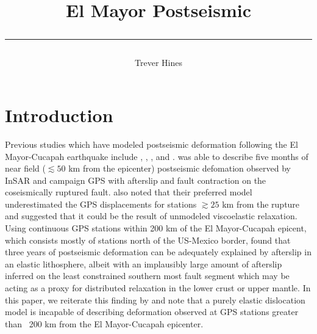 \documentclass[12pt]{article}
\title{	
El Mayor Postseismic
\author{Trever Hines}
\rule{\headwidth}{1.0pt}
}
\begin{document}
\maketitle
\section*{Introduction}

Previous studies which have modeled postseismic deformation following the El Mayor-Cucapah earthquake include \cite{Pollitz2012}, \cite{Gonzalez-ortega2014}, \cite{Spinler2015}, and \cite{Rollins2015}. \cite{Gonzalez-ortega2014} was able to describe five months of near field ($\lesssim 50$ km from the epicenter) postseismic defomation observed by InSAR and campaign GPS with afterslip and fault contraction on the coseismically ruptured fault. \cite{Gonzalez-ortega2014} also noted that their preferred model underestimated the GPS displacements for stations $\gtrsim 25$ km from the rupture and suggested that it could be the result of unmodeled viscoelastic relaxation.  Using continuous GPS stations within 200 km of the El Mayor-Cucapah epicent, which consists mostly of stations north of the US-Mexico border, \cite{Rollins2015} found that three years of postseismic deformation can be adequately explained by afterslip in an elastic lithosphere, albeit with an implausibly large amount of afterslip inferred on the least constrained southern most fault segment which may be acting as a proxy for distributed relaxation in the lower crust or upper mantle. In this paper, we reiterate this finding by \cite{Rollins2015} and note that a purely elastic dislocation model is incapable of describing deformation observed at GPS stations greater than ~200 km from the El Mayor-Cucapah epicenter.  
\end{document}
